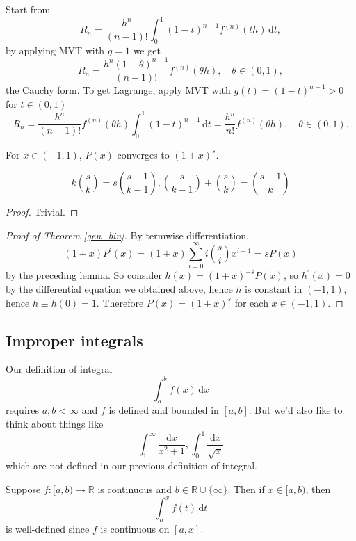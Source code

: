 Start from 
\[
    R_n = \frac{h^n}{(n-1)!}\int_{0}^{1} (1-t)^{n-1}f^{(n)}(th) \,\mathrm{d}t,
\]
by applying MVT with $g=1$ we get
\[
    R_n = \frac{h^n (1-\theta)^{n-1}}{(n-1)!}f^{(n)}(\theta h),\quad \theta\in (0,1),
\]
the Cauchy form. To get Lagrange, apply MVT with $ g(t)=(1-t)^{n-1}>0 $ for $ t\in (0,1)$
\[
    R_n=\frac{h^n}{(n-1)!} f^{(n)}(\theta h) \int_{0}^{1} (1-t)^{n-1} \,\mathrm{d}t = \frac{h^n }{n!}f^{(n)}(\theta h),\quad \theta\in (0,1). 
\]

\begin{theorem}\label{gen_bin}
    For $x\in (-1,1)$, $P(x)$ converges to $(1+x)^s$.
\end{theorem}
\begin{lemma}
    $$k\binom{s}{k}=s\binom{s-1}{k-1},\binom{s}{k-1}+\binom{s}{k}=\binom{s+1}{k}$$ 
\end{lemma}
\begin{proof}
    Trivial.
\end{proof}
\begin{proof}[Proof of Theorem \ref{gen_bin}]
    By termwise differentiation,
    $$(1+x)P^\prime(x)=(1+x)\sum_{i=0}^\infty i\binom{s}{i}x^{i-1}=sP(x)$$
    by the preceding lemma.
    So consider $h(x)=(1+x)^{-s}P(x)$, so $h^\prime(x)=0$ by the differential equation we obtained above, hence $h$ is constant in $(-1,1)$, hence $h\equiv h(0)=1$.
    Therefore $P(x)=(1+x)^s$ for each $x\in (-1,1)$.
\end{proof}

\subsection{Improper integrals}

Our definition of integral
$$\int_a^bf(x)\,\mathrm dx$$
requires $a,b<\infty$ and $f$ is defined and bounded in $[a,b]$.
But we'd also like to think about things like
$$\int_1^\infty\frac{\mathrm dx}{x^2+1},\int_0^1\frac{\mathrm dx}{\sqrt{x}}$$
which are not defined in our previous definition of integral.

Suppose $f:[a,b)\to\mathbb R$ is continuous and $b\in\mathbb R\cup\{\infty\}$.
Then if $x\in [a,b)$, then
$$\int_a^xf(t)\,\mathrm dt$$
is well-defined since $f$ is continuous on $[a,x]$.

